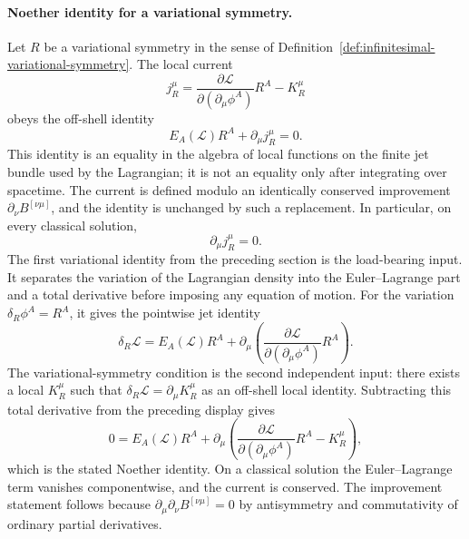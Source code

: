 \paragraph{Noether identity for a variational symmetry.}
Let \(R\) be a variational symmetry in the sense of
Definition~\ref{def:infinitesimal-variational-symmetry}.  The local current
\[
  j_R^\mu
  =
  \frac{\partial\mathcal L}{\partial(\partial_\mu\phi^A)}R^A
  -
  K_R^\mu
\]
obeys the off-shell identity
\begin{equation}
  E_A(\mathcal L)R^A+\partial_\mu j_R^\mu=0.
\label{eq:noether-identity-variational-symmetry}
\end{equation}
This identity is an equality in the algebra of local functions on the finite
jet bundle used by the Lagrangian; it is not an equality only after integrating
over spacetime.  The current is defined modulo an identically conserved
improvement \(\partial_\nu B^{[\nu\mu]}\), and the identity is unchanged by
such a replacement.
In particular, on every classical solution,
\[
  \partial_\mu j_R^\mu=0 .
\]
The first variational identity from the preceding section is the load-bearing
input.  It separates the variation of the Lagrangian density into the
Euler--Lagrange part and a total derivative before imposing any equation of
motion.  For the variation \(\delta_R\phi^A=R^A\), it gives the pointwise jet
identity
\[
  \delta_R\mathcal L
  =
  E_A(\mathcal L)R^A
  +
  \partial_\mu
  \left(
    \frac{\partial\mathcal L}{\partial(\partial_\mu\phi^A)}R^A
  \right).
\]
The variational-symmetry condition is the second independent input:
there exists a local \(K_R^\mu\) such that
\(\delta_R\mathcal L=\partial_\mu K_R^\mu\) as an off-shell local identity.
Subtracting this total derivative from the preceding display gives
\[
  0
  =
  E_A(\mathcal L)R^A
  +
  \partial_\mu
  \left(
    \frac{\partial\mathcal L}{\partial(\partial_\mu\phi^A)}R^A-K_R^\mu
  \right),
\]
which is the stated Noether identity.  On a classical solution the
Euler--Lagrange term vanishes componentwise, and the current is conserved.
The improvement statement follows because
\(\partial_\mu\partial_\nu B^{[\nu\mu]}=0\) by antisymmetry and commutativity of
ordinary partial derivatives.

